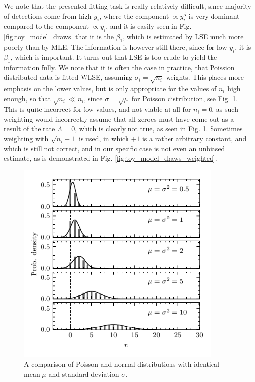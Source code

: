 We note that the presented fitting task is really relatively difficult, since majority of detections come from high $y_i$, where the component $\propto y_i^5$ is very dominant compared to the component $\propto y_i$, and it is easily seen in Fig. \ref{fig:toy_model_draws} that it is the $\beta_1$, which is estimated by LSE much more poorly than by MLE. The information is however still there, since for low $y_i$, it is $\beta_1$, which is important. It turns out that LSE is too crude to yield the information fully. We note that it is often the case in practice, that Poission distributed data is fitted WLSE, assuming $\sigma_i = \sqrt{n_i}$ weights. This places more emphasis on the lower values, but is only appropriate for the values of $n_i$ high enough, so that $\sqrt{n_i} \ll n_i$, since $\sigma = \sqrt{\mu}$ for Poisson distribution, see Fig. \ref{fig:pois_vs_norm}. This is quite incorrect for low values, and not viable at all for $n_i = 0$, as such weighting would incorrectly assume that all zeroes must have come out as a result of the rate $\Lambda = 0$, which is clearly not true, as seen in Fig. \ref{fig:pois_vs_norm}. Sometimes weighting with $\sqrt{n_i+1}$ is used, in which $+1$ is a rather arbitrary constant, and which is still not correct, and in our specific case is not even an unbiased estimate, as is demonstrated in Fig. \ref{fig:toy_model_draws_weighted}. 

\begin{figure}[h]
 	\centering
 	\includegraphics[width=10cm]{figures/pois_vs_norm.pdf}
 	\caption{A comparison of Poisson and normal distributions with identical mean $\mu$ and standard deviation $\sigma$.}
 	\label{fig:pois_vs_norm}
\end{figure}

